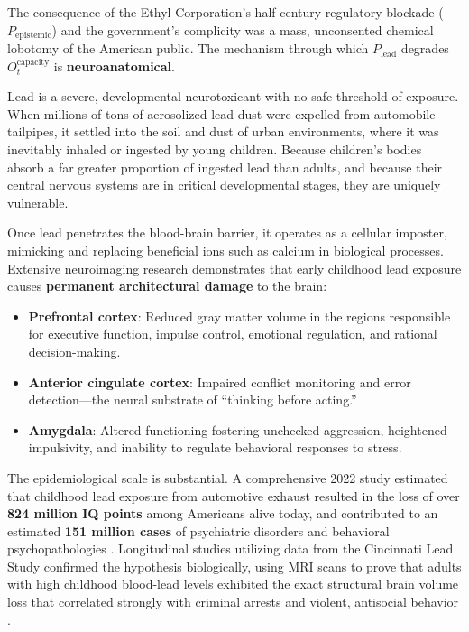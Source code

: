 The consequence of the Ethyl Corporation's half-century regulatory blockade ($P_{\text{epistemic}}$) and the government's complicity was a mass, unconsented chemical lobotomy of the American public. The mechanism through which $P_{\text{lead}}$ degrades $O_t^{\text{capacity}}$ is \textbf{neuroanatomical}.

Lead is a severe, developmental neurotoxicant with no safe threshold of exposure. When millions of tons of aerosolized lead dust were expelled from automobile tailpipes, it settled into the soil and dust of urban environments, where it was inevitably inhaled or ingested by young children. Because children's bodies absorb a far greater proportion of ingested lead than adults, and because their central nervous systems are in critical developmental stages, they are uniquely vulnerable.

Once lead penetrates the blood-brain barrier, it operates as a cellular imposter, mimicking and replacing beneficial ions such as calcium in biological processes. Extensive neuroimaging research demonstrates that early childhood lead exposure causes \textbf{permanent architectural damage} to the brain:
\begin{itemize}
\tightlist
\item \textbf{Prefrontal cortex}: Reduced gray matter volume in the regions responsible for executive function, impulse control, emotional regulation, and rational decision-making.
\item \textbf{Anterior cingulate cortex}: Impaired conflict monitoring and error detection---the neural substrate of ``thinking before acting.''
\item \textbf{Amygdala}: Altered functioning fostering unchecked aggression, heightened impulsivity, and inability to regulate behavioral responses to stress.
\end{itemize}

The epidemiological scale is substantial. A comprehensive 2022 study estimated that childhood lead exposure from automotive exhaust resulted in the loss of over \textbf{824 million IQ points} among Americans alive today, and contributed to an estimated \textbf{151 million cases} of psychiatric disorders and behavioral psychopathologies \cite{tel_iq_loss}. Longitudinal studies utilizing data from the Cincinnati Lead Study confirmed the hypothesis biologically, using MRI scans to prove that adults with high childhood blood-lead levels exhibited the exact structural brain volume loss that correlated strongly with criminal arrests and violent, antisocial behavior \cite{tel_cincinnati}.


